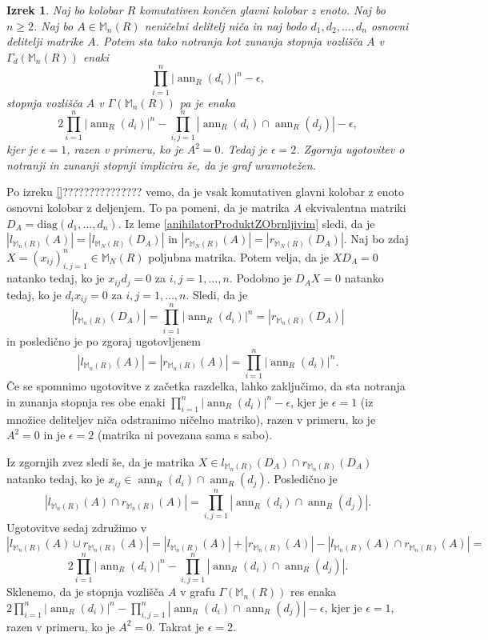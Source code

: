 \documentclass[a4paper, 12pt]{amsart}
\theoremstyle{definition} %
\theoremstyle{plain} %
\newtheorem{izrek}[definicija]{Izrek}
\newcommand{\M}{\mathbb M}
\DeclareMathOperator{\ann}{ann}
\begin{document}
\begin{izrek}
\label{inDegreeOutDegree}
Naj bo kolobar $R$ komutativen končen glavni kolobar z enoto. Naj bo $n \ge 2$. Naj bo $A\in \M_n(R)$ neničelni delitelj niča in naj bodo $d_1,d_2, \dots,d_n$ osnovni delitelji matrike $A$. Potem sta tako notranja kot zunanja stopnja vozlišča $A$ v $\Gamma_d(\M_n(R))$ enaki
$$
\prod_{i=1}^n |\ann_R(d_i)|^n - \epsilon,
$$ 
stopnja vozlišča $A$ v $\Gamma(\M_n(R))$ pa je enaka
$$
2\prod_{i=1}^n |\ann_R(d_i)|^n - \prod_{i,j=1}^n |\ann_R(d_i) \cap \ann_R(d_j)| - \epsilon,
$$
kjer je $\epsilon =1$, razen v primeru, ko je $A^2 = 0$. Tedaj je $\epsilon = 2$. Zgornja ugotovitev o notranji in zunanji stopnji implicira še, da je graf uravnotežen.
\end{izrek}
 
\proof
Po izreku  \ref{}??????????????? vemo, da je vsak komutativen glavni kolobar z enoto osnovni kolobar z deljenjem. To pa pomeni, da je matrika $A$ ekvivalentna matriki $D_A= \text{diag}(d_1,\dots,d_n)$. Iz leme \ref{anihilatorProduktZObrnljivim} sledi, da je $|l_{\M_n(R)}(A)| = |l_{\M_N(R)}(D_A)|$ in $|r_{\M_N(R)}(A)| = |r_{\M_N(R)}(D_A)|$. Naj bo zdaj $X=(x_{ij})_{i,j=1}^n\in \M_N(R)$ poljubna matrika. Potem velja, da je $XD_A = 0$ natanko tedaj, ko je $x_{ij}d_j = 0$ za $i,j = 1, \dots, n$. Podobno je $D_AX = 0$ natanko tedaj, ko je $d_i x_{ij} =0 $ za $i,j=1,\dots,n$. Sledi, da je 
$$
|l_{\M_n(R)}(D_A)| = \prod_{i=1}^n |\ann_R(d_i)|^n = |r_{\M_n(R)}(D_A)|
$$
in posledično je po zgoraj ugotovljenem
$$
|l_{\M_n(R)}(A)|= |r_{\M_n(R)}(A)| = \prod_{i=1}^n |\ann_R(d_i)|^n .
$$
Če se spomnimo ugotovitve z začetka razdelka, lahko zaključimo, da sta notranja in zunanja stopnja res obe enaki $\prod_{i=1}^n  |\ann_R(d_i)|^n - \epsilon$, kjer je $\epsilon = 1$ (iz množice deliteljev niča odstranimo ničelno matriko), razen v primeru, ko je $A^2 = 0$ in je $\epsilon = 2$ (matrika ni povezana sama s sabo). 

Iz zgornjih zvez sledi še, da je matrika $X\in l_{\M_n(R)}(D_A)\cap r_{\M_n(R)}(D_A)$ natanko tedaj, ko je $x_{ij} \in  \ann_R(d_i)\cap \ann_R(d_j)$. Posledično je 
$$
|l_{\M_n(R)}(A) \cap r_{\M_n(R)}(A)| = \prod_{i,j=1}^n | \ann_R(d_i) \cap \ann_R(d_j)|.
$$
Ugotovitve sedaj združimo v 
$$
|l_{\M_n(R)}(A) \cup r_{\M_n(R)}(A)| = |l_{\M_n(R)}(A)|  + |r_{\M_n(R)}(A)| - |l_{\M_n(R)}(A) \cap r_{\M_n(R)}(A)|=
$$
$$
2\prod_{i=1}^n |\ann_R(d_i)|^n - \prod_{i,j=1}^n |\ann_R(d_i) \cap \ann_R(d_j)|.
$$
Sklenemo, da je stopnja vozlišča $A$ v grafu $\Gamma(\M_n(R))$ res enaka $2\prod_{i=1}^n |\ann_R(d_i)|^n - \prod_{i,j=1}^n |\ann_R(d_i) \cap \ann_R(d_j)| -\epsilon$, kjer je $\epsilon=1$, razen v primeru, ko je $A^2 = 0$. Takrat je $\epsilon=2$.
\endproof
\end{document}
